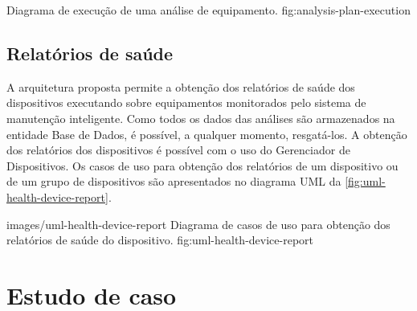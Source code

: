   {Diagrama de execução de uma análise de equipamento.}
  {fig:analysis-plan-execution}


%
%


\subsection{Relatórios de saúde}

A arquitetura proposta permite a obtenção dos relatórios de saúde dos dispositivos executando sobre
equipamentos monitorados pelo sistema de manutenção inteligente. Como todos os dados das análises
são armazenados na entidade Base de Dados, é possível, a qualquer momento, resgatá-los. A obtenção
dos relatórios dos dispositivos é possível com o uso do Gerenciador de Dispositivos. Os casos de uso
para obtenção dos relatórios de um dispositivo ou de um grupo de dispositivos são apresentados no
diagrama \gls{UML} da \cref{fig:uml-health-device-report}.

  {images/uml-health-device-report}
  {Diagrama de casos de uso para obtenção dos relatórios de saúde do dispositivo.}
  {fig:uml-health-device-report}


\section{Estudo de caso}

